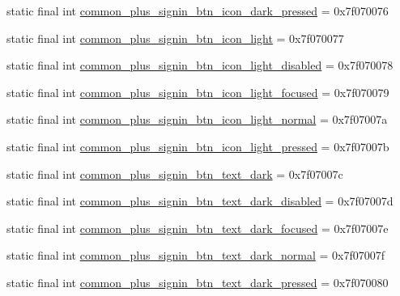 \begin{DoxyCompactItemize}
\item 
static final int \mbox{\hyperlink{classcom_1_1google_1_1android_1_1gms_1_1R_1_1drawable_a48c761e9bd637541c33666704ba2bbe9}{common\+\_\+plus\+\_\+signin\+\_\+btn\+\_\+icon\+\_\+dark\+\_\+pressed}} = 0x7f070076
\item 
static final int \mbox{\hyperlink{classcom_1_1google_1_1android_1_1gms_1_1R_1_1drawable_aefca2bfee85491f1b75058b7d3164c8c}{common\+\_\+plus\+\_\+signin\+\_\+btn\+\_\+icon\+\_\+light}} = 0x7f070077
\item 
static final int \mbox{\hyperlink{classcom_1_1google_1_1android_1_1gms_1_1R_1_1drawable_aeed359d4a5d2643131af7cc3d0e8cc29}{common\+\_\+plus\+\_\+signin\+\_\+btn\+\_\+icon\+\_\+light\+\_\+disabled}} = 0x7f070078
\item 
static final int \mbox{\hyperlink{classcom_1_1google_1_1android_1_1gms_1_1R_1_1drawable_aed0223abd3ab12d4f63defe4a664c667}{common\+\_\+plus\+\_\+signin\+\_\+btn\+\_\+icon\+\_\+light\+\_\+focused}} = 0x7f070079
\item 
static final int \mbox{\hyperlink{classcom_1_1google_1_1android_1_1gms_1_1R_1_1drawable_af3f681eeb29cb44a6f84e698a5a47572}{common\+\_\+plus\+\_\+signin\+\_\+btn\+\_\+icon\+\_\+light\+\_\+normal}} = 0x7f07007a
\item 
static final int \mbox{\hyperlink{classcom_1_1google_1_1android_1_1gms_1_1R_1_1drawable_ac68678022b70c9cfb5f06ef8d36538d0}{common\+\_\+plus\+\_\+signin\+\_\+btn\+\_\+icon\+\_\+light\+\_\+pressed}} = 0x7f07007b
\item 
static final int \mbox{\hyperlink{classcom_1_1google_1_1android_1_1gms_1_1R_1_1drawable_aeda7826d71fa7431cda27105449a9ad0}{common\+\_\+plus\+\_\+signin\+\_\+btn\+\_\+text\+\_\+dark}} = 0x7f07007c
\item 
static final int \mbox{\hyperlink{classcom_1_1google_1_1android_1_1gms_1_1R_1_1drawable_aecfeed84bd9056d5473801bd36b2b1e0}{common\+\_\+plus\+\_\+signin\+\_\+btn\+\_\+text\+\_\+dark\+\_\+disabled}} = 0x7f07007d
\item 
static final int \mbox{\hyperlink{classcom_1_1google_1_1android_1_1gms_1_1R_1_1drawable_aa5df2275626b2bd2461982c7fa68d256}{common\+\_\+plus\+\_\+signin\+\_\+btn\+\_\+text\+\_\+dark\+\_\+focused}} = 0x7f07007e
\item 
static final int \mbox{\hyperlink{classcom_1_1google_1_1android_1_1gms_1_1R_1_1drawable_ae2fec903cc9b374e27f369dedaf9501e}{common\+\_\+plus\+\_\+signin\+\_\+btn\+\_\+text\+\_\+dark\+\_\+normal}} = 0x7f07007f
\item 
static final int \mbox{\hyperlink{classcom_1_1google_1_1android_1_1gms_1_1R_1_1drawable_a6a819075eca95773a4ea0792303f0218}{common\+\_\+plus\+\_\+signin\+\_\+btn\+\_\+text\+\_\+dark\+\_\+pressed}} = 0x7f070080

\end{DoxyCompactItemize}
